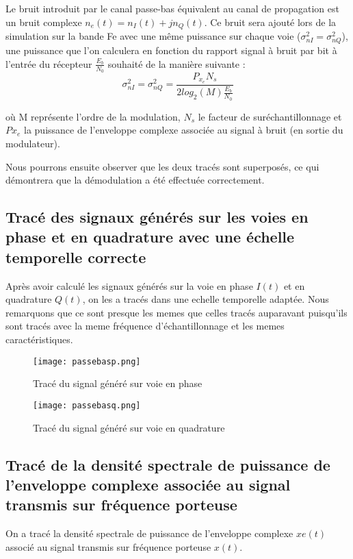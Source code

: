 \documentclass[11pt]{article}
\begin{document}
Le bruit introduit par le canal passe-bas équivalent au canal de propagation est un bruit complexe $n_e(t) = n_I(t) + jn_Q(t)$. Ce bruit sera ajouté lors de la simulation sur la bande Fe avec une même puissance sur chaque voie ($\sigma_{nI}^2 = \sigma_{nQ}^2$), une puissance que l'on calculera en fonction du rapport signal à bruit par bit à l'entrée du récepteur $\frac{E_b}{N_0}$ souhaité de la manière suivante :
$$\sigma_{nI}^2 = \sigma_{nQ}^2 = \frac{P_{x_e}N_s}{2log_2(M)\frac{E_b}{N_0}}$$

où M représente l'ordre de la modulation, $N_s$ le facteur de suréchantillonnage et $P{x_e}$ la puissance de l'enveloppe complexe associée au signal à bruit (en sortie du modulateur).

Nous pourrons ensuite observer que les deux tracés sont superposés, ce qui démontrera que la démodulation a été effectuée correctement.
\subsection{ Tracé des signaux générés sur les voies en phase et en quadrature avec une échelle temporelle correcte}
Après avoir calculé les signaux générés sur la voie en phase $I(t)$ et en quadrature $Q(t)$, on les a tracés dans une echelle temporelle adaptée. Nous remarquons que ce sont presque les memes que celles tracés auparavant puisqu'ils sont tracés avec la meme fréquence d'échantillonnage et les memes caractéristiques.

\begin{figure}[ht!]
    \centering
    \texttt{[image: passebasp.png]}
    \caption{Tracé du signal généré sur voie en phase  \label{fig : PasseBasPhase}}
\end{figure}

\begin{figure}[ht!]
    \centering
    \texttt{[image: passebasq.png]}
    \caption{Tracé du signal généré sur voie en quadrature  \label{fig : PasseBasQuadrature}}
\end{figure}

\subsection{Tracé de la densité spectrale de puissance de l’enveloppe complexe associée au signal transmis sur
fréquence porteuse}

On a tracé la densité spectrale de puissance de l'enveloppe complexe $xe(t)$ associé au signal transmis sur fréquence porteuse $x(t)$.
\end{document}
